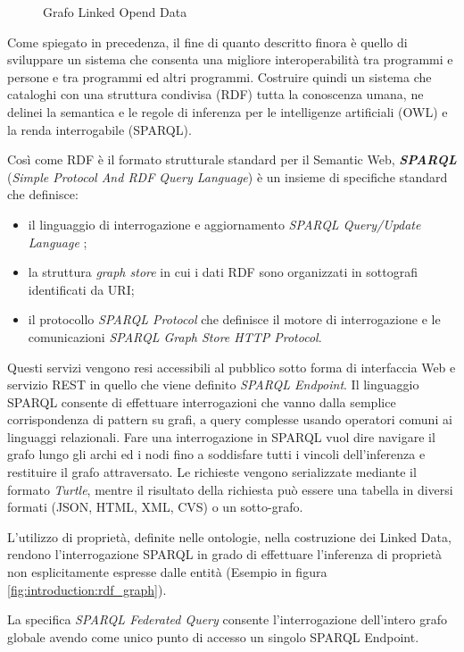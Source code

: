 \begin{figure}[htb]
	\caption{Grafo Linked Opend Data}
	\label{fig:introduction:lod}
\end{figure}


Come spiegato in precedenza, il fine di quanto descritto finora è quello di sviluppare un sistema che consenta una migliore interoperabilità tra programmi e persone e tra programmi ed altri programmi. Costruire quindi un sistema che cataloghi con una struttura condivisa (RDF) tutta la conoscenza umana, ne delinei la semantica e le regole di inferenza per le intelligenze artificiali (OWL) e la renda interrogabile (SPARQL). 


Così come RDF è il formato strutturale standard per il Semantic Web, \textbf{\textit{SPARQL}} (\textit{Simple Protocol And RDF Query Language}) \cite{sparql_overview} è un insieme di specifiche standard che definisce:
\begin{itemize}
\item il linguaggio di interrogazione e aggiornamento \textit{SPARQL Query/Update Language} ;
\item la struttura \textit{graph store}  in cui i dati RDF sono organizzati in sottografi identificati da URI;
\item il protocollo \textit{SPARQL Protocol} che definisce il motore di interrogazione e le comunicazioni \textit{SPARQL Graph Store HTTP Protocol}.
\end{itemize}
Questi servizi vengono resi accessibili al pubblico sotto forma di interfaccia Web e servizio REST in quello che viene definito \textit{SPARQL Endpoint}.
Il linguaggio SPARQL consente di effettuare interrogazioni che vanno dalla semplice corrispondenza di pattern su grafi, a query complesse usando operatori comuni ai linguaggi relazionali. 
Fare una interrogazione in SPARQL vuol dire navigare il grafo lungo gli archi ed i nodi fino a soddisfare tutti i vincoli dell’inferenza e restituire il grafo attraversato. Le richieste vengono serializzate mediante il formato \textit{Turtle}, mentre il risultato della richiesta può essere una tabella in diversi formati (JSON, HTML, XML, CVS) o un sotto-grafo.

L'utilizzo di proprietà, definite nelle ontologie, nella costruzione dei Linked Data, rendono l'interrogazione SPARQL in grado di effettuare l'inferenza di proprietà non esplicitamente espresse dalle entità (Esempio in figura \ref{fig:introduction:rdf_graph}).

La specifica \textit{SPARQL Federated Query} consente l'interrogazione dell'intero grafo globale avendo come unico punto di accesso un singolo SPARQL Endpoint.


